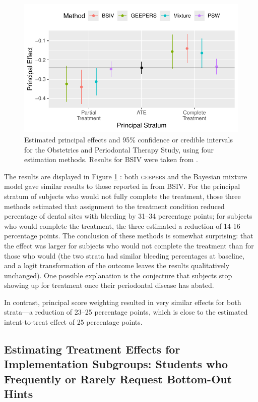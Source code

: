 \documentclass[]{article}
\begin{document}
\begin{figure}
  \centering
  \includegraphics{figure/opts.pdf}
  \caption{Estimated principal effects and 95\% confidence or credible intervals for the Obstetrics and Periodontal Therapy Study, using four estimation methods. Results for BSIV were taken from \citet{richardson2023estimating}.}
  \label{fig:opt}
\end{figure}


The results are displayed in Figure \ref{fig:opt}%
: both \textsc{geepers} and the Bayesian mixture model gave similar results to those reported in \citet{richardson2023estimating} from BSIV.
For the principal stratum of subjects who would not fully complete the treatment, those three methods estimated that assignment to the treatment condition reduced percentage of dental sites with bleeding by 31--34 percentage points; for subjects who would complete the treatment, the three estimated a reduction of 14-16 percentage points.
The conclusion of these methods is somewhat surprising: that the effect was larger for subjects who would not complete the treatment than for those who would (the two strata had similar bleeding percentages at baseline, and a logit transformation of the outcome leaves the results qualitatively unchanged). 
One possible explanation is the conjecture that subjects stop showing up for treatment once their periodontal disease has abated.

In contrast, principal score weighting resulted in very similar effects for both strata---a reduction of 23--25 percentage points, which is close to the estimated intent-to-treat effect of 25 percentage points.

\subsection{Estimating Treatment Effects for Implementation Subgroups: Students who Frequently or Rarely Request Bottom-Out Hints}\label{sec:fh2t}
\end{document}
